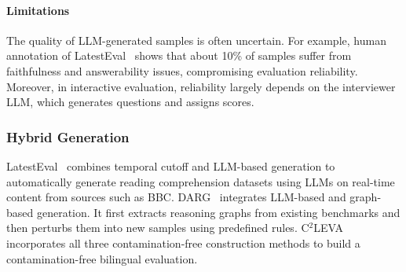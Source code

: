 \paragraph{Limitations}
The quality of LLM-generated samples is often uncertain. For example, human annotation of LatestEval~\citep{li2023avoiding} shows that about 10\% of samples suffer from faithfulness and answerability issues, compromising evaluation reliability. Moreover, in interactive evaluation, reliability largely depends on the interviewer LLM, which generates questions and assigns scores.

\subsubsection{Hybrid Generation}
LatestEval~\citep{li2023avoiding} combines temporal cutoff and LLM-based generation to automatically generate reading comprehension datasets using LLMs on real-time content from sources such as BBC.
DARG~\citep{zhang2024darg} integrates LLM-based and graph-based generation. It first extracts reasoning graphs from existing benchmarks and then perturbs them into new samples using predefined rules.
C$^2$LEVA~\citep{li2024c} incorporates all three contamination-free construction methods to build a contamination-free bilingual evaluation.

